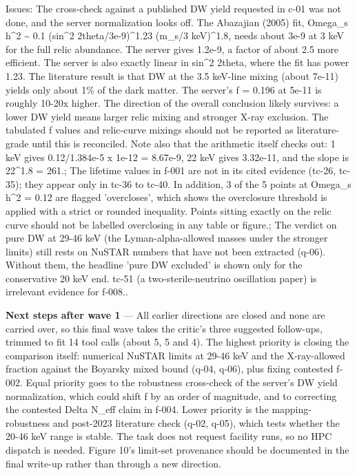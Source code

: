 \documentclass[11pt,a4paper]{article}
\begin{document}
Issues: The cross-check against a published DW yield requested in c-01 was not done, and the server normalization looks off. The Abazajian (2005) fit, Omega\_s h\textasciicircum{}2 \textasciitilde{} 0.1 (sin\textasciicircum{}2 2theta/3e-9)\textasciicircum{}1.23 (m\_s/3 keV)\textasciicircum{}1.8, needs about 3e-9 at 3 keV for the full relic abundance. The server gives 1.2e-9, a factor of about 2.5 more efficient. The server is also exactly linear in sin\textasciicircum{}2 2theta, where the fit has power 1.23. The literature result is that DW at the 3.5 keV-line mixing (about 7e-11) yields only about 1\% of the dark matter. The server's f = 0.196 at 5e-11 is roughly 10-20x higher. The direction of the overall conclusion likely survives: a lower DW yield means larger relic mixing and stronger X-ray exclusion. The tabulated f values and relic-curve mixings should not be reported as literature-grade until this is reconciled. Note also that the arithmetic itself checks out: 1 keV gives 0.12/1.384e-5 x 1e-12 = 8.67e-9, 22 keV gives 3.32e-11, and the slope is 22\textasciicircum{}1.8 = 261.; The lifetime values in f-001 are not in its cited evidence (tc-26, tc-35); they appear only in tc-36 to tc-40. In addition, 3 of the 5 points at Omega\_s h\textasciicircum{}2 = 0.12 are flagged 'overcloses', which shows the overclosure threshold is applied with a strict or rounded inequality. Points sitting exactly on the relic curve should not be labelled overclosing in any table or figure.; The verdict on pure DW at 29-46 keV (the Lyman-alpha-allowed masses under the stronger limits) still rests on NuSTAR numbers that have not been extracted (q-06). Without them, the headline 'pure DW excluded' is shown only for the conservative 20 keV end. tc-51 (a two-sterile-neutrino oscillation paper) is irrelevant evidence for f-008..

\textbf{Next steps after wave 1} --- All earlier directions are closed and none are carried over, so this final wave takes the critic's three suggested follow-ups, trimmed to fit 14 tool calls (about 5, 5 and 4). The highest priority is closing the comparison itself: numerical NuSTAR limits at 29-46 keV and the X-ray-allowed fraction against the Boyarsky mixed bound (q-04, q-06), plus fixing contested f-002. Equal priority goes to the robustness cross-check of the server's DW yield normalization, which could shift f by an order of magnitude, and to correcting the contested Delta N\_eff claim in f-004. Lower priority is the mapping-robustness and post-2023 literature check (q-02, q-05), which tests whether the 20-46 keV range is stable. The task does not request facility runs, so no HPC dispatch is needed. Figure 10's limit-set provenance should be documented in the final write-up rather than through a new direction.
\end{document}
